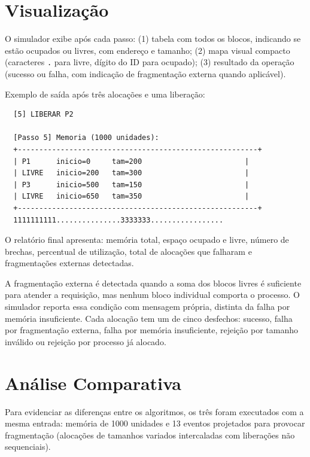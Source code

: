 \documentclass[12pt]{article}
\begin{document}
\section{Visualização}

O simulador exibe após cada passo: (1) tabela com todos os blocos, indicando se estão ocupados ou livres, com endereço e tamanho; (2) mapa visual compacto (caracteres \texttt{.} para livre, dígito do ID para ocupado); (3) resultado da operação (sucesso ou falha, com indicação de fragmentação externa quando aplicável).

Exemplo de saída após três alocações e uma liberação:

\begin{lstlisting}
  [5] LIBERAR P2

  [Passo 5] Memoria (1000 unidades):
  +--------------------------------------------------------+
  | P1      inicio=0     tam=200                        |
  | LIVRE   inicio=200   tam=300                        |
  | P3      inicio=500   tam=150                        |
  | LIVRE   inicio=650   tam=350                        |
  +--------------------------------------------------------+
  1111111111...............3333333.................
\end{lstlisting}

O relatório final apresenta: memória total, espaço ocupado e livre, número de brechas, percentual de utilização, total de alocações que falharam e fragmentações externas detectadas.

A fragmentação externa é detectada quando a soma dos blocos livres é suficiente para atender a requisição, mas nenhum bloco individual comporta o processo. O simulador reporta essa condição com mensagem própria, distinta da falha por memória insuficiente. Cada alocação tem um de cinco desfechos: sucesso, falha por fragmentação externa, falha por memória insuficiente, rejeição por tamanho inválido ou rejeição por processo já alocado.

\section{Análise Comparativa}

Para evidenciar as diferenças entre os algoritmos, os três foram executados com a mesma entrada: memória de 1000 unidades e 13 eventos projetados para provocar fragmentação (alocações de tamanhos variados intercaladas com liberações não sequenciais).
\end{document}
